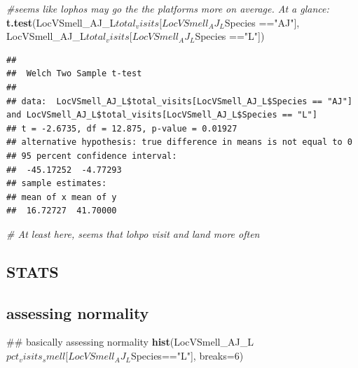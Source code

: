 \documentclass[]{article}
\newenvironment{Shaded}{\begin{snugshade}}{\end{snugshade}}
\newcommand{\KeywordTok}[1]{\textcolor[rgb]{0.13,0.29,0.53}{\textbf{{#1}}}}
\newcommand{\DataTypeTok}[1]{\textcolor[rgb]{0.13,0.29,0.53}{{#1}}}
\newcommand{\DecValTok}[1]{\textcolor[rgb]{0.00,0.00,0.81}{{#1}}}
\newcommand{\StringTok}[1]{\textcolor[rgb]{0.31,0.60,0.02}{{#1}}}
\newcommand{\CommentTok}[1]{\textcolor[rgb]{0.56,0.35,0.01}{\textit{{#1}}}}
\newcommand{\NormalTok}[1]{{#1}}
\begin{document}
\begin{Shaded}
\begin{Highlighting}[]
\CommentTok{#seems like lophos may go the the platforms more on average. At a glance: }
\KeywordTok{t.test}\NormalTok{(LocVSmell_AJ_L$total_visits[LocVSmell_AJ_L$Species ==}\StringTok{"AJ"}\NormalTok{], LocVSmell_AJ_L$total_visits[LocVSmell_AJ_L$Species ==}\StringTok{"L"}\NormalTok{])}
\end{Highlighting}
\end{Shaded}

\begin{verbatim}
## 
##  Welch Two Sample t-test
## 
## data:  LocVSmell_AJ_L$total_visits[LocVSmell_AJ_L$Species == "AJ"] and LocVSmell_AJ_L$total_visits[LocVSmell_AJ_L$Species == "L"]
## t = -2.6735, df = 12.875, p-value = 0.01927
## alternative hypothesis: true difference in means is not equal to 0
## 95 percent confidence interval:
##  -45.17252  -4.77293
## sample estimates:
## mean of x mean of y 
##  16.72727  41.70000
\end{verbatim}

\begin{Shaded}
\begin{Highlighting}[]
\CommentTok{# At least here, seems that lohpo visit and land more often}
\end{Highlighting}
\end{Shaded}

\subsection{STATS}\label{stats-1}

\subsection{assessing normality}\label{assessing-normality-1}

\begin{Shaded}
\begin{Highlighting}[]
\NormalTok{## basically assessing normality}
\KeywordTok{hist}\NormalTok{(LocVSmell_AJ_L$pct_visits_smell[LocVSmell_AJ_L$Species==}\StringTok{"L"}\NormalTok{], }\DataTypeTok{breaks=}\DecValTok{6}\NormalTok{)}
\end{Highlighting}
\end{Shaded}
\end{document}
